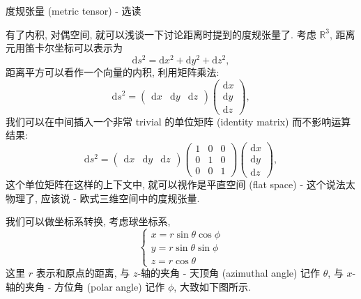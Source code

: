 \begin{newquote}
度规张量 (metric tensor) - 选读

有了内积, 对偶空间, 就可以浅谈一下讨论距离时提到的度规张量了. 考虑
\(\mathbb{R}^3\), 距离元用笛卡尔坐标可以表示为 \[
\mathrm{d}s^2=\mathrm{d}x^2+\mathrm{d}y^2+\mathrm{d}z^2,
\] 距离平方可以看作一个向量的内积, 利用矩阵乘法: \[
\mathrm{d}s^2=\begin{pmatrix}\mathrm{d}x&\mathrm{d}y&\mathrm{d}z\end{pmatrix}\begin{pmatrix}\mathrm{d}x\\\mathrm{d}y\\\mathrm{d}z\end{pmatrix},
\] 我们可以在中间插入一个非常 trivial 的单位矩阵 (identity matrix)
而不影响运算结果: \[
\mathrm{d}s^2=\begin{pmatrix}\mathrm{d}x&\mathrm{d}y&\mathrm{d}z\end{pmatrix}\begin{pmatrix}1&0&0\\0&1&0\\0&0&1\end{pmatrix}\begin{pmatrix}\mathrm{d}x\\\mathrm{d}y\\\mathrm{d}z\end{pmatrix},
\] 这个单位矩阵在这样的上下文中, 就可以视作是平直空间 (flat space) -
这个说法太物理了, 应该说 - 欧式三维空间中的度规张量.

我们可以做坐标系转换, 考虑球坐标系, \[
\begin{cases}
x=r\sin\theta\cos\phi\\
y=r\sin\theta\sin\phi\\
z=r\cos\theta
\end{cases}
\] 这里 \(r\) 表示和原点的距离, 与 \(z\)-轴的夹角 - 天顶角 (azimuthal
angle) 记作 \(\theta\), 与 \(x\)-轴的夹角 - 方位角 (polar angle) 记作
\(\phi\), 大致如下图所示.



\end{newquote}
